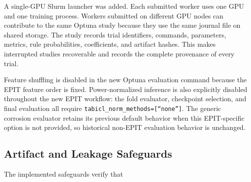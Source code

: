 \documentclass{article}
\begin{document}
A single-GPU Slurm launcher was added. Each submitted worker uses one GPU and
one training process. Workers submitted on different GPU nodes can contribute
to the same Optuna study because they use the same journal file on shared
storage. The study records trial identifiers, commands, parameters, metrics,
rule probabilities, coefficients, and artifact hashes. This makes interrupted
studies recoverable and records the complete provenance of every trial.

Feature shuffling is disabled in the new Optuna evaluation command because the
EPIT feature order is fixed. Power-normalized inference is also explicitly
disabled throughout the new EPIT workflow: the fold evaluator, checkpoint
selection, and final evaluation all require
\texttt{tabicl\_norm\_methods=[``none'']}. The generic corrosion evaluator
retains its previous default behavior when this EPIT-specific option is not
provided, so historical non-EPIT evaluation behavior is unchanged.

\subsection{Artifact and Leakage Safeguards}
\label{sec:epit-pipeline-safeguards}

The implemented safeguards verify that
\end{document}

